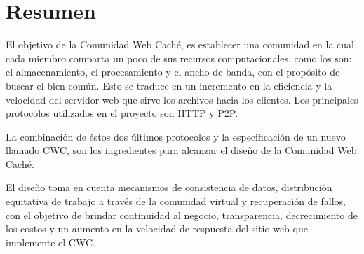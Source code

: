

\begingroup
\let\clearpage\relax
\let\cleardoublepage\relax
\let\cleardoublepage\relax

\chapter*{Resumen} %

El objetivo de la Comunidad Web Caché, es establecer una comunidad en la cual cada miembro comparta un poco de sus recursos computacionales, como los son: el almacenamiento, el procesamiento y el ancho de banda, con el propósito de buscar el bien común. Esto se traduce en un incremento en la eficiencia y la velocidad del servidor web que sirve los archivos hacia los clientes. Los principales protocolos utilizados en el proyecto son HTTP y P2P. 

La combinación de éstos dos últimos protocolos y la especificación de un nuevo llamado CWC, son los ingredientes para alcanzar el diseño de la Comunidad Web Caché. 

El diseño toma en cuenta mecanismos de consistencia de datos, distribución equitativa de trabajo a través de la comunidad virtual y recuperación de fallos, con el objetivo de brindar continuidad al negocio, transparencia, decrecimiento de los costos y un aumento en la velocidad de respuesta del sitio web que implemente el CWC. 

\endgroup			

\vfill
